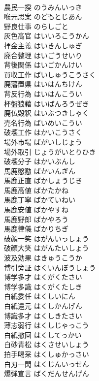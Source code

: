 \documentclass[8pt]{extreport}
\begin{document}
\begin{CJK}{UTF8}{min}
\\	農民一揆	のうみんいっき	
\\	喉元思案	のどもとじあん	
\\	野良仕事	のらしごと	
\\	灰色高官	はいいろこうかん	
\\	拝金主義	はいきんしゅぎ	
\\	廃合整理	はいごうせいり	
\\	背後関係	はいごかんけい	
\\	買収工作	ばいしゅうこうさく	
\\	廃藩置県	はいはんちけん	
\\	背反行為	はいはんこうい	
\\	杯盤狼藉	はいばんろうぜき	
\\	廃仏毀釈	はいぶつきしゃく	
\\	売名行為	ばいめいこうい	
\\	破壊工作	はかいこうさく	
\\	場外市場	ばがいしじょう	
\\	場外取引	じょうがいとりひき	
\\	破壊分子	はかいぶんし	
\\	馬鹿慇懃	ばかいんぎん	
\\	馬鹿正直	ばかしょうじき	
\\	馬鹿高値	ばかたかね	
\\	馬鹿丁寧	ばかていねい	
\\	馬鹿安値	ばかやすね	
\\	馬鹿野郎	ばかやろう	
\\	馬鹿律儀	ばかりちぎ	
\\	破顔一笑	はがんいっしょう	
\\	破顔大笑	はがんたいしょう	
\\	波及効果	はきゅうこうか	
\\	博引旁証	はくいんぼうしょう	
\\	博学多才	はくがくたさい	
\\	博学多識	はくがくたしき	
\\	白紙委任	はくしいにん	
\\	白紙還元	はくしかんげん	
\\	博識多才	はくしきたさい	
\\	薄志弱行	はくしじゃっこう	
\\	白紙撤回	はくしてっかい	
\\	白砂青松	はくさせいしょう	
\\	拍手喝采	はくしゅかっさい	
\\	白刃一閃	はくじんいっせん	
\\	爆弾宣言	ばくだんせんげん	

\end{CJK}
\end{document}
